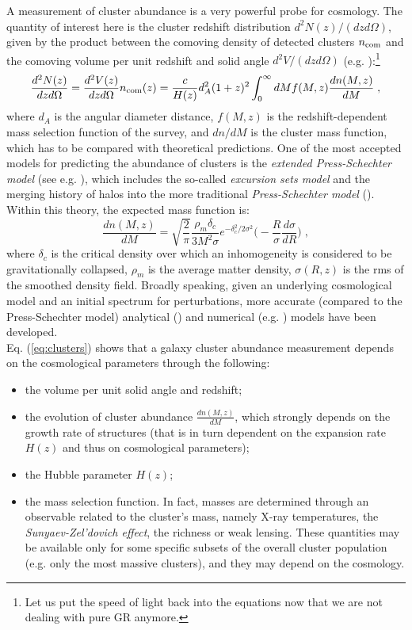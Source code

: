 A measurement of cluster abundance is a very powerful probe for cosmology. The quantity of interest here is the cluster redshift distribution $d^2N(z)/(dzd\Omega)$, given by the product between the comoving density of detected clusters $n_{\rm com}$ and the comoving volume per unit redshift and solid angle $d^2V/(dzd\Omega)$ (e.g. \citealt{descollaboration}):\footnote{Let us put the speed of light back into the equations now that we are not dealing with pure GR anymore.}
\begin{equation}
\frac{d^2N(z)}{dzd\Omega}=\frac{d^2V(z)}{dzd\Omega}n_{\rm com}(z)=\frac{c}{H(z)}d_A^2(1+z)^2\int_0^\infty dM f(M,z)\frac{dn(M,z)}{dM}\;,\label{eq:clusters}
\end{equation}
where $d_A$ is the angular diameter distance, $f(M,z)$ is the redshift-dependent mass selection function of the survey, and $dn/dM$ is the cluster mass function, which has to be compared with theoretical predictions. One of the most accepted models for predicting the abundance of clusters is the \emph{extended Press-Schechter model} (see e.g. \citealt{2003MNRAS.344..149H}), which includes the so-called \emph{excursion sets model} and the merging history of halos into the more traditional \emph{Press-Schechter model} (\citealt{press}). Within this theory, the expected mass function is:
\begin{equation}
\frac{dn(M,z)}{dM}= \sqrt{\frac{2}{\pi}}\frac{\rho_m \delta_c}{3M^2\sigma}e^{-\delta_c^2/2\sigma^2}\Big( -\frac{R}{\sigma}\frac{d\sigma}{dR}\Big)\;,
\end{equation}
where $\delta_c$ is the critical density over which an inhomogeneity is considered to be gravitationally collapsed, $\rho_m$ is the average matter density, $\sigma(R,z)$ is the rms of the smoothed density field. Broadly speaking, given an underlying cosmological model and an initial spectrum for perturbations, more accurate (compared to the Press-Schechter model) analytical (\citealt{sheth}) and numerical (e.g. \citealt{jenkins}) models have been developed.\\
Eq. (\ref{eq:clusters}) shows that a galaxy cluster abundance measurement depends on the cosmological parameters through the following:
\begin{itemize}
\item the volume per unit solid angle and redshift;
\item the evolution of cluster abundance $\frac{dn(M,z)}{dM}$, which strongly depends on the growth rate of structures (that is in turn dependent on the expansion rate $H(z)$ and thus on cosmological parameters);
\item the Hubble parameter $H(z)$;
\item the mass selection function. In fact, masses are determined through an observable related to the cluster's mass, namely X-ray temperatures, the \emph{Sunyaev-Zel'dovich effect}, the richness or weak lensing. These quantities may be available only for some specific subsets of the overall cluster population (e.g. only the most massive clusters), and they may depend on the cosmology.
\end{itemize}
